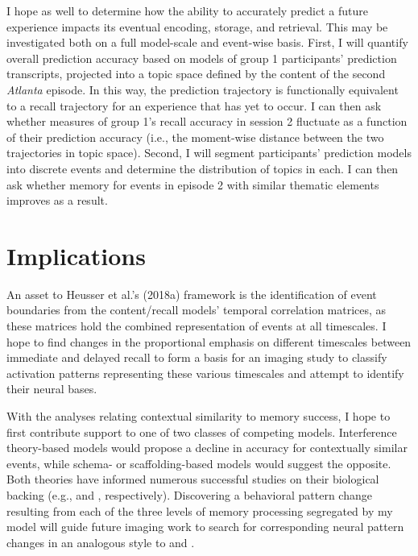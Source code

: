 \documentclass{article}
\begin{document}
I hope as well to determine how the ability to accurately predict a future experience impacts its eventual encoding, storage, and retrieval. This may be investigated both on a full model-scale and event-wise basis. First, I will quantify overall prediction accuracy based on models of group 1 participants' prediction transcripts, projected into a topic space defined by the content of the second \textit{Atlanta} episode. In this way, the prediction trajectory is functionally equivalent to a recall trajectory for an experience that has yet to occur.  I can then ask whether measures of group 1's recall accuracy in session 2 fluctuate as a function of their prediction accuracy (i.e., the moment-wise distance between the two trajectories in topic space).  Second, I will segment participants' prediction models into discrete events and determine the distribution of topics in each.  I can then ask whether memory for events in episode 2 with similar thematic elements improves as a result.


\section{Implications}

An asset to Heusser et al.'s (2018a) framework is the identification of event boundaries from the content/recall models' temporal correlation matrices, as these matrices hold the combined representation of events at all timescales. I hope to find changes in the proportional emphasis on different timescales between immediate and delayed recall to form a basis for an imaging study to classify activation patterns representing these various timescales and attempt to identify their neural bases.

With the analyses relating contextual similarity to memory success, I hope to first contribute support to one of two classes of competing models. Interference theory-based models \citep[see][]{WixtRohr93} would propose a decline in accuracy for contextually similar events, while schema- or scaffolding-based models \citep[see][]{BobrNorm75} would suggest the opposite.  Both theories have informed numerous successful studies on their biological backing (e.g., \citealt{MeckEtal03,JoniNee06,LyonEtal08} and \citealt{Cast05,KestEtal12,GilbMarl17}, respectively).  Discovering a behavioral pattern change resulting from each of the three levels of memory processing segregated by my model will guide future imaging work to search for corresponding neural pattern changes in an analogous style to \cite{BaldEtal17} and \cite{HeusEtal18c}.
\end{document}
